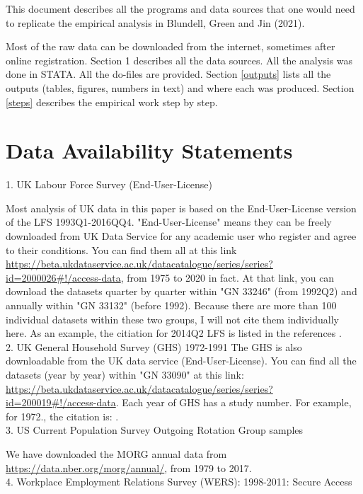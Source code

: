 \documentclass[12pt]{article}
\begin{document}
This document describes all the programs and data sources that one would need to replicate the empirical analysis in Blundell, Green and Jin (2021).

Most of the raw data can be downloaded from the internet, sometimes after online registration. Section 1 describes all the data sources. All the analysis was done in STATA. All the do-files are provided. Section \ref{outputs} lists all the outputs (tables, figures, numbers in text) and where each was produced. Section \ref{steps} describes the empirical work step by step.

\section{Data Availability Statements}
1.	UK Labour Force Survey  (End-User-License) 

Most analysis of UK data in this paper is based on the End-User-License version of the LFS 1993Q1-2016QQ4. "End-User-License" means they can be freely downloaded from UK Data Service for any academic user who register and agree to their conditions. You can find them all at this link \url{https://beta.ukdataservice.ac.uk/datacatalogue/series/series?id=2000026#!/access-data}, from 1975 to 2020 in fact. At that link, you can download the datasets quarter by quarter within "GN 33246" (from 1992Q2) and annually within "GN 33132" (before 1992). Because there are more than 100 individual datasets within these two groups, I will not cite them individually here. As an example, the citiation for 2014Q2 LFS is listed in the references \cite{lfs2014}.\\

2.	UK General Household Survey (GHS) 1972-1991 
The GHS is also downloadable from the UK data service (End-User-License). You can find all the datasets (year by year) within "GN 33090" at this link: \url{https://beta.ukdataservice.ac.uk/datacatalogue/series/series?id=200019#!/access-data}.
Each year of GHS has a study number. For example, for 1972., the citation is: \cite{ghs1972}.
\\

3.	US Current Population Survey Outgoing Rotation Group samples

We have downloaded the MORG annual data from \url{https://data.nber.org/morg/annual/}, from 1979 to 2017.\\

4.	Workplace Employment Relations Survey (WERS): 1998-2011: Secure Access
\end{document}

